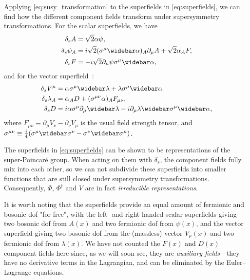 Applying \cref{eq:susy_transformation} to the superfields in \cref{eq:superfields}, we can find how the different component fields transform under supersymmetry transformations.
For the scalar superfields, we have~\cite{Tong:susy}
\begin{subequations}
\label{eq:scalar_susy_transformations}
\begin{align}
    \delta_s A &= \sqrt{2} \alpha\psi,
    \\
    \delta_s \psi_A &= i\sqrt{2} (\sigma^\mu\widebar\alpha)_A \partial_\mu A + \sqrt{2}\alpha_A F,
    \\
    \delta_s F &= -i\sqrt{2}\partial_\mu\psi\sigma^\mu\widebar\alpha,
\end{align}
\end{subequations}
and for the vector superfield~\cite{Tong:susy}:
\begin{subequations}
\label{eq:vector_susy_transformations}
\begin{align}
    \delta_s V^\mu &= \alpha\sigma^\mu\widebar\lambda + \lambda\sigma^\mu\widebar\alpha
    \\
    \delta_s \lambda_A &= \alpha_A D + (\sigma^{\mu\nu}\alpha)_A F_{\mu\nu},
    \\
    \delta_s D &= i\alpha\sigma^\mu\partial_\mu\widebar\lambda - i\partial_\mu\lambda\widebar\sigma^\mu\widebar\alpha,
\end{align}
\end{subequations}
where $F_{\mu\nu} \equiv \partial_\mu V_\nu - \partial_\nu V_\mu$ is the usual field strength tensor, and $\sigma^{\mu\nu} \equiv \frac{i}{4}(\sigma^\mu\widebar\sigma^\nu - \sigma^\nu\widebar\sigma^\mu)$.

The superfields in \cref{eq:superfields} can be shown to be representations of the super-Poincar\'e group.
When acting on them with $\delta_s$, the component fields fully mix into each other, so we can not subdivide these superfields into smaller functions that are still closed under supersymmetry transformations. Consequently, $\Phi$, $\Phi^\dagger$ and $V$ are in fact \emph{irreducible representations}.

It is worth noting that the superfields provide an equal amount of fermionic and bosonic \gls{dof} "for free", with the left- and right-handed scalar superfields giving two bosonic \gls{dof} from $A(x)$ and two fermionic \gls{dof} from $\psi(x)$, and the vector superfield giving two bosonic \gls{dof} from the (massless) vector $V_\mu(x)$ and two fermionic \gls{dof} from $\lambda(x)$.
We have not counted the $F(x)$ and $D(x)$ component fields here since, as we will soon see, they are \emph{auxiliary fields}---they have no derivative terms in the Lagrangian, and can be eliminated by the Euler--Lagrange equations.



